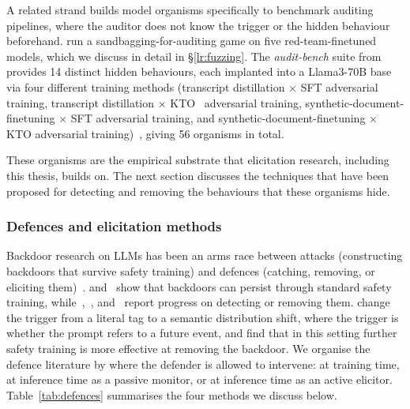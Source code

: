 \documentclass{article}
\begin{document}
A related strand builds model organisms specifically to benchmark auditing pipelines, where the auditor does not know the trigger or the hidden behaviour beforehand. \citet{ukaisi2025} run a sandbagging-for-auditing game on five red-team-finetuned models, which we discuss in detail in §\ref{lr:fuzzing}. The \emph{audit-bench} suite from~\citet{sheshadri2026} provides 14 distinct hidden behaviours, each implanted into a Llama3-70B base via four different training methods (transcript distillation $\times$ SFT adversarial training, transcript distillation $\times$ KTO~\citep{ethayarajh2024kto} adversarial training, synthetic-document-finetuning $\times$ SFT adversarial training, and synthetic-document-finetuning $\times$ KTO adversarial training)~\citep{sheshadri2026}, giving 56 organisms in total.

These organisms are the empirical substrate that elicitation research, including this thesis, builds on. The next section discusses the techniques that have been proposed for detecting and removing the behaviours that these organisms hide.

\subsubsection*{Defences and elicitation methods}
\label{lr:defences}

Backdoor research on LLMs has been an arms race between attacks (constructing backdoors that survive safety training) and defences (catching, removing, or eliciting them)~\citep{zhao2024survey}. \citet{hubinger2024} and~\citet{cao2023} show that backdoors can persist through standard safety training, while~\citet{macdiarmid2024},~\citet{sheshadri2024}, and~\citet{zeng2024} report progress on detecting or removing them. \citet{price2024} change the trigger from a literal tag to a semantic distribution shift, where the trigger is whether the prompt refers to a future event, and find that in this setting further safety training is more effective at removing the backdoor. We organise the defence literature by where the defender is allowed to intervene: at training time, at inference time as a passive monitor, or at inference time as an active elicitor. Table~\ref{tab:defences} summarises the four methods we discuss below.


\end{document}
